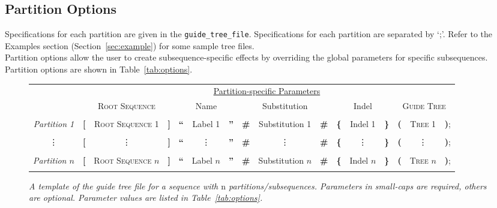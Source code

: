 \documentclass[10pt]{article}
\begin{document}
\subsection{Partition Options}
\label{sec:partition_options}

 Specifications for each partition are given in the {\tt guide\_tree\_file}. Specifications for each partition are separated by `;'. Refer to the Examples section (Section~\ref{sec:example}) for some sample tree files.\\

 Partition options allow the user to create subsequence-specific effects by overriding the global parameters for specific subsequences. Partition options are shown in Table~\ref{tab:options}.

\begin{figure}
 \begin{small}
 \begin{tabular}{c|lcrlcrlcrlcrlcr}
 \hline
 \hline
  & \multicolumn{15}{c}{\underline{Partition-specific Parameters}}
  \\

  & \multicolumn{3}{c}{\textsc{Root Sequence}}
  & \multicolumn{3}{c}{Name}
  & \multicolumn{3}{c}{Substitution}
  & \multicolumn{3}{c}{Indel}
  & \multicolumn{3}{c}{\textsc{Guide Tree}}
  \\
 \hline
\\
 \textit{Partition 1} &
 \textbf{[}  & \textsc{Root Sequence 1} & \textbf{]} &
 \textbf{``} & Label 1         			& \textbf{''} &
 \textbf{\#} & Substitution 1  			& \textbf{\#}&
 \textbf{\{} & Indel 1         			& \textbf{\}} &
 \textbf{(}  & \textsc{Tree 1}          & \textbf{)};
 \\
 \\
 \vdots &
 \textbf{[}  & \vdots & \textbf{]} &
 \textbf{``} & \vdots & \textbf{''} &
 \textbf{\#} & \vdots & \textbf{\#}&
 \textbf{\{} & \vdots & \textbf{\}} &
 \textbf{(}  & \vdots & \textbf{)};
 \\
 \\
 \textit{Partition $n$} &
 \textbf{[}  & \textsc{Root Sequence $n$} & \textbf{]} &
 \textbf{``} & Label $n$         		  & \textbf{''} &
 \textbf{\#} & Substitution $n$  		  & \textbf{\#}&
 \textbf{\{} & Indel $n$                  & \textbf{\}} &
 \textbf{(}  & \textsc{Tree $n$}          & \textbf{)};
 \\
 \\
 \hline
 \hline
 \end{tabular}
\end{small}
\caption{\textit{A template of the guide tree file for a sequence with $\mathrm{n}$ partitions/subsequences. Parameters in small-caps are required, others are optional. Parameter values are listed in Table~\ref{tab:options}.}}
\end{figure}
\end{document}
